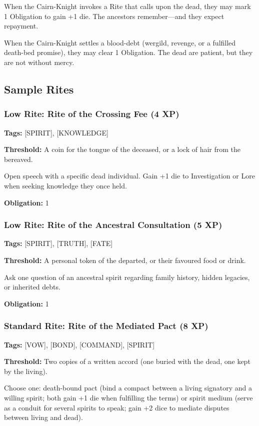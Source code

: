 When the Cairn-Knight invokes a Rite that calls upon the dead, they may mark 1 Obligation to gain +1 die. The ancestors remember—and they expect repayment.

When the Cairn-Knight settles a blood-debt (wergild, revenge, or a fulfilled death-bed promise), they may clear 1 Obligation. The dead are patient, but they are not without mercy.

\subsection{Sample Rites}

\subsubsection{Low Rite: Rite of the Crossing Fee (4 XP)}

\textbf{Tags:} [SPIRIT], [KNOWLEDGE]

\textbf{Threshold:} A coin for the tongue of the deceased, or a lock of hair from the bereaved.

Open speech with a specific dead individual. Gain +1 die to Investigation or Lore when seeking knowledge they once held.

\textbf{Obligation:} 1

\subsubsection{Low Rite: Rite of the Ancestral Consultation (5 XP)}

\textbf{Tags:} [SPIRIT], [TRUTH], [FATE]

\textbf{Threshold:} A personal token of the departed, or their favoured food or drink.

Ask one question of an ancestral spirit regarding family history, hidden legacies, or inherited debts.

\textbf{Obligation:} 1

\subsubsection{Standard Rite: Rite of the Mediated Pact (8 XP)}

\textbf{Tags:} [VOW], [BOND], [COMMAND], [SPIRIT]

\textbf{Threshold:} Two copies of a written accord (one buried with the dead, one kept by the living).

Choose one: death-bound pact (bind a compact between a living signatory and a willing spirit; both gain +1 die when fulfilling the terms) or spirit medium (serve as a conduit for several spirits to speak; gain +2 dice to mediate disputes between living and dead).

